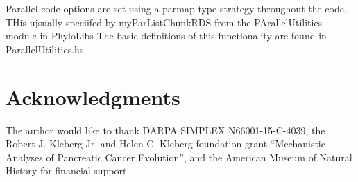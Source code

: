 \documentclass[11pt]{article}
\begin{document}
	Parallel code options are set using a parmap-type strategy throughout the code.  THis ujsually speciifed by myParListChunkRDS from the PArallelUtilities module in PhyloLibs The basic definitions of this functionality are found in ParallelUtilities.hs
	
	\section*{Acknowledgments}
	The author would like to thank DARPA SIMPLEX N66001-15-C-4039, the  Robert J. Kleberg Jr. and Helen C. Kleberg foundation grant ``Mechanistic Analyses of Pancreatic Cancer Evolution'', and the American Museum of Natural History for financial support.  
	
	\newpage
	
\end{document}
